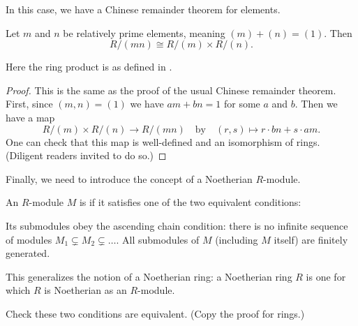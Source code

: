 In this case, we have a Chinese remainder theorem for elements.
\begin{theorem}
	Let $m$ and $n$ be relatively prime elements, meaning $(m) + (n) = (1)$.
	Then \[ R / (mn) \cong R/(m) \times R/(n). \]
\end{theorem}
Here the ring product is as defined in .
\begin{proof}
	This is the same as the proof of the usual Chinese remainder theorem.
	First, since $(m,n)=(1)$ we have $am+bn=1$ for some $a$ and $b$.
	Then we have a map
	\[ R/(m) \times R/(n) \to R/(mn) \quad\text{by}\quad
		(r,s) \mapsto r \cdot bn + s \cdot am. \]
	One can check that this map is well-defined and an isomorphism of rings.
	(Diligent readers invited to do so.)
\end{proof}

Finally, we need to introduce the concept of a Noetherian $R$-module.
\begin{definition}
	An $R$-module $M$ is 
	if it satisfies one of the two equivalent conditions:
	\begin{itemize}
		\ii Its submodules obey the ascending chain condition:
		there is no infinite sequence of modules
		$M_1 \subsetneq M_2 \subsetneq \dots$.
		\ii All submodules of $M$ (including $M$ itself) are finitely generated.
	\end{itemize}
\end{definition}
This generalizes the notion of a Noetherian ring:
a Noetherian ring $R$ is one for which $R$ is Noetherian as an $R$-module.
\begin{ques}
	Check these two conditions are equivalent. (Copy the proof for rings.)
\end{ques}

